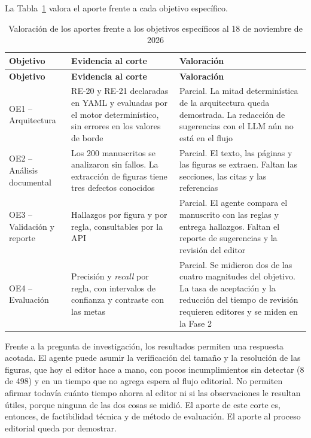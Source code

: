 La Tabla~\ref{tab:4-12} valora el aporte frente a cada objetivo específico.

{\small
\begin{longtable}{@{}>{\raggedright\arraybackslash}p{}>{\raggedright\arraybackslash}p{}>{\raggedright\arraybackslash}p{}@{}}
\caption{Valoración de los aportes frente a los objetivos específicos al 18 de noviembre de 2026}\label{tab:4-12}\\
\toprule
\textbf{Objetivo} & \textbf{Evidencia al corte} & \textbf{Valoración} \\
\midrule
\endfirsthead
\toprule
\textbf{Objetivo} & \textbf{Evidencia al corte} & \textbf{Valoración} \\
\midrule
\endhead
\bottomrule
\endfoot
\endlastfoot
OE1 -- Arquitectura & RE-20 y RE-21 declaradas en YAML y evaluadas por el motor determinístico, sin errores en los valores de borde & Parcial. La mitad determinística de la arquitectura queda demostrada. La redacción de sugerencias con el LLM aún no está en el flujo \\
\addlinespace
OE2 -- Análisis documental & Los 200 manuscritos se analizaron sin fallos. La extracción de figuras tiene tres defectos conocidos & Parcial. El texto, las páginas y las figuras se extraen. Faltan las secciones, las citas y las referencias \\
\addlinespace
OE3 -- Validación y reporte & Hallazgos por figura y por regla, consultables por la API & Parcial. El agente compara el manuscrito con las reglas y entrega hallazgos. Faltan el reporte de sugerencias y la revisión del editor \\
\addlinespace
OE4 -- Evaluación & Precisión y \emph{recall} por regla, con intervalos de confianza y contraste con las metas & Parcial. Se midieron dos de las cuatro magnitudes del objetivo. La tasa de aceptación y la reducción del tiempo de revisión requieren editores y se miden en la Fase 2 \\
\end{longtable}
}

Frente a la pregunta de investigación, los resultados permiten una respuesta acotada. El agente puede asumir la verificación del tamaño y la resolución de las figuras, que hoy el editor hace a mano, con pocos incumplimientos sin detectar (8 de 498) y en un tiempo que no agrega espera al flujo editorial. No permiten afirmar todavía cuánto tiempo ahorra al editor ni si las observaciones le resultan útiles, porque ninguna de las dos cosas se midió. El aporte de este corte es, entonces, de factibilidad técnica y de método de evaluación. El aporte al proceso editorial queda por demostrar.

